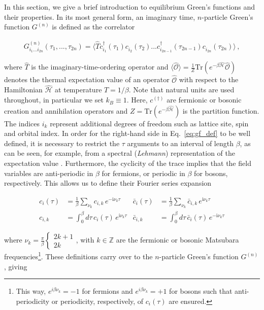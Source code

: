 \documentclass{SciPost}
\newcommand{\cdag}{c^{\dagger}}
\newcommand{\cnodag}{c^{\phantom{\dagger}}}
\newcommand{\Gn}[1]{G^{(#1)}}
\begin{document}
In this section, we give a brief introduction to equilibrium Green's functions and their properties. 
In its most general form, an imaginary time, $n$-particle Green's function $\Gn{n}$ is defined as the correlator \cite{rohringer2013}
%
\begin{linenomath}
    \begin{align}
        \Gn{n}_{i_1 ... i_{2n}}(\tau_1, ..., \tau_{2n}) = \langle \hat{T} \cdag_{i_1}(\tau_1) \cnodag_{i_2}(\tau_2) ... \cdag_{i_{2n - 1}}(\tau_{2n - 1}) \cnodag_{i_{2n}}(\tau_{2n}) \rangle \,,
        \label{eq:gf_def}
    \end{align}
\end{linenomath}
%
where $\hat{T}$ is the imaginary-time-ordering operator and $\langle \hat{\mathcal{O}} \rangle = \tfrac{1}{Z} \mathrm{Tr}(e^{-\beta \hat{\mathcal{H}}} \hat{\mathcal{O}})$ denotes the thermal expectation value of an operator $\hat{\mathcal{O}}$ with respect to the Hamiltonian $\hat{\mathcal{H}}$ at temperature $T = 1 / \beta$. Note that natural units are used throughout, in particular we set $k_B\equiv 1$. Here, $c^{(\dagger)}$ are fermionic or bosonic creation and annihilation operators and $Z = \mathrm{Tr}(e^{-\beta \hat{\mathcal{H}}})$ is the partition function. The indices $i_k$ represent additional degrees of freedom such as lattice site, spin and orbital index. In order for the right-hand side in Eq.~\eqref{eq:gf_def} to be well defined, it is necessary to restrict the $\tau$ arguments to an interval of length $\beta$, as can be seen, for example, from a spectral (\textsl{Lehmann}) representation of the expectation value \cite{rohringer2013}. Furthermore, the cyclicity of the trace implies that the field variables are anti-periodic in $\beta$ for fermions, or periodic in $\beta$ for bosons, respectively. This allows us to define their Fourier series expansion
%
\begin{linenomath}
    \begin{align}
        c_{i}(\tau) &= \tfrac{1}{\beta} \sum_{\nu_k} c_{i, k}\, e^{-\mathrm{i}\nu_k\tau} & \bar{c}_{i}(\tau) &= \tfrac{1}{\beta} \sum_{\nu_k} \bar{c}_{i, k}\, e^{\mathrm{i}\nu_k\tau} \\
        c_{i, k} & = \int_0^\beta d\tau\, c_{i}(\tau)\, e^{\mathrm{i}\nu_k\tau} & \bar{c}_{i, k} & = \int_0^\beta d\tau\, \bar{c}_{i}(\tau)\, e^{-\mathrm{i}\nu_k\tau}
    \end{align}
\end{linenomath}
%
where $\nu_k = \frac{\pi}{\beta}
\begin{cases}
     2k + 1  \\
     2k
\end{cases}$, with $k \in \mathbb{Z}$ are the fermionic or bosonic Matsubara frequencies\footnote{ This way, $e^{i \beta \nu_k} = -1$ for fermions and $e^{i \beta \nu_k} = +1$ for bosons such that anti-periodicity or periodicity, respectively, of $c_{i}(\tau)$ are ensured.}. These definitions carry over to the $n$-particle Green's function $G^{(n)}$, giving
\end{document}
